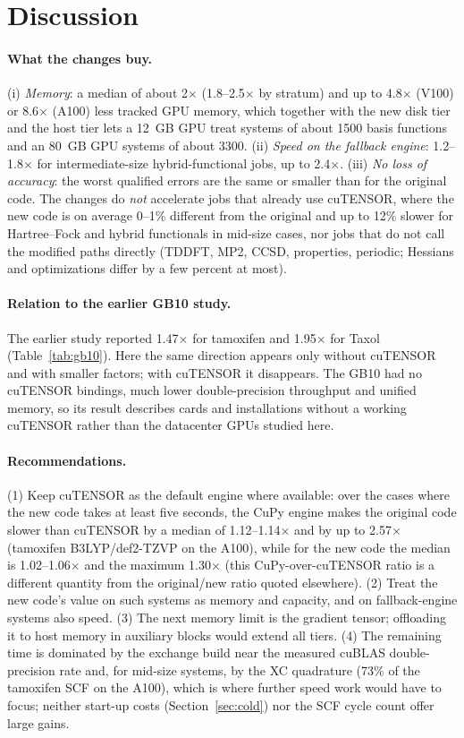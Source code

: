 \section{Discussion}
\label{sec:discussion}

\paragraph{What the changes buy.} (i) \emph{Memory}: a median of about 2$\times$ (1.8--2.5$\times$ by stratum) and up to 4.8$\times$ (V100) or 8.6$\times$ (A100) less tracked GPU memory, which together with the new disk tier and the host tier lets a 12~GB GPU treat systems of about 1500 basis functions and an 80~GB GPU systems of about 3300. (ii) \emph{Speed on the fallback engine}: 1.2--1.8$\times$ for intermediate-size hybrid-functional jobs, up to 2.4$\times$. (iii) \emph{No loss of accuracy}: the worst qualified errors are the same or smaller than for the original code. The changes do \emph{not} accelerate jobs that already use cuTENSOR, where the new code is on average 0--1\% different from the original and up to 12\% slower for Hartree--Fock and hybrid functionals in mid-size cases, nor jobs that do not call the modified paths directly (TDDFT, MP2, CCSD, properties, periodic; Hessians and optimizations differ by a few percent at most).

\paragraph{Relation to the earlier GB10 study.} The earlier study reported 1.47$\times$ for tamoxifen and 1.95$\times$ for Taxol (Table~\ref{tab:gb10}). Here the same direction appears only without cuTENSOR and with smaller factors; with cuTENSOR it disappears. The GB10 had no cuTENSOR bindings, much lower double-precision throughput and unified memory, so its result describes cards and installations without a working cuTENSOR rather than the datacenter GPUs studied here.

\paragraph{Recommendations.} (1) Keep cuTENSOR as the default engine where available: over the cases where the new code takes at least five seconds, the CuPy engine makes the original code slower than cuTENSOR by a median of 1.12--1.14$\times$ and by up to 2.57$\times$ (tamoxifen B3LYP/def2-TZVP on the A100), while for the new code the median is 1.02--1.06$\times$ and the maximum 1.30$\times$ (this CuPy-over-cuTENSOR ratio is a different quantity from the original/new ratio quoted elsewhere). (2) Treat the new code's value on such systems as memory and capacity, and on fallback-engine systems also speed. (3) The next memory limit is the gradient tensor; offloading it to host memory in auxiliary blocks would extend all tiers. (4) The remaining time is dominated by the exchange build near the measured cuBLAS double-precision rate and, for mid-size systems, by the XC quadrature (73\% of the tamoxifen SCF on the A100), which is where further speed work would have to focus; neither start-up costs (Section~\ref{sec:cold}) nor the SCF cycle count offer large gains.
